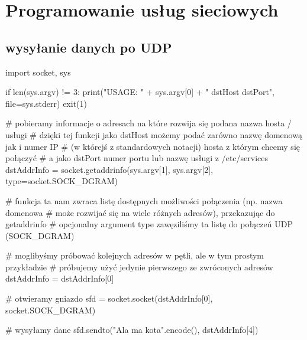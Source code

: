% 
% 
% 
% 

\section{Programowanie usług sieciowych}

\subsection{wysyłanie danych po UDP}
\begin{CodeFrame*}[python]{}
import socket, sys

if len(sys.argv) != 3:
  print("USAGE: " + sys.argv[0] + " dstHost dstPort", file=sys.stderr)
  exit(1)

# pobieramy informacje o adresach na które rozwija się podana nazwa hosta / usługi
# dzięki tej funkcji jako dstHost możemy podać zarówno nazwę domenową jak i numer IP 
# (w którejś z standardowych notacji) hosta z którym chcemy się połączyć
# a jako dstPort numer portu lub nazwę usługi z /etc/services
dstAddrInfo = socket.getaddrinfo(sys.argv[1], sys.argv[2], type=socket.SOCK_DGRAM)

# funkcja ta nam zwraca listę dostępnych możliwości połączenia (np. nazwa domenowa
# może rozwijać się na wiele różnych adresów), przekazując do getaddrinfo
# opcjonalny argument type zawęziliśmy ta listę do połączeń UDP (SOCK_DGRAM)

# moglibyśmy próbować kolejnych adresów w pętli, ale w tym prostym przykładzie
# próbujemy użyć jedynie pierwszego ze zwróconych adresów
dstAddrInfo = dstAddrInfo[0]

# otwieramy gniazdo
sfd = socket.socket(dstAddrInfo[0], socket.SOCK_DGRAM)

# wysyłamy dane
sfd.sendto("Ala ma kota".encode(), dstAddrInfo[4])
\end{CodeFrame*}


